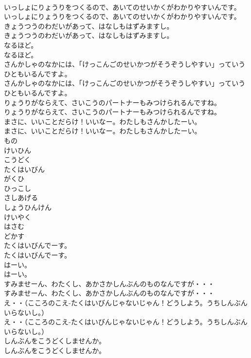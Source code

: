 \documentclass[8pt]{extreport}
\begin{document}
\begin{CJK}{UTF8}{min}
\\	いっしょにりょうりをつくるので、あいてのせいかくがわかりやすいんです。
\\	いっしょにりょうりをつくるので、あいてのせいかくがわかりやすいんです。
\\	きょうつうのわだいがあって、はなしもはずみますし。
\\	きょうつうのわだいがあって、はなしもはずみますし。
\\	なるほど。
\\	なるほど。
\\	さんかしゃのなかには、「けっこんごのせいかつがそうぞうしやすい」っていうひともいるんですよ。
\\	さんかしゃのなかには、「けっこんごのせいかつがそうぞうしやすい」っていうひともいるんですよ。
\\	りょうりがならえて、さいこうのパートナーもみつけられるんですね。
\\	りょうりがならえて、さいこうのパートナーもみつけられるんですね。
\\	まさに、いいことだらけ！いいなー。わたしもさんかしたーい。
\\	まさに、いいことだらけ！いいなー。わたしもさんかしたーい。
\\	もの
\\	けいひん
\\	こうどく
\\	たくはいびん
\\	がくひ
\\	ひっこし
\\	さしあげる
\\	しょうひんけん
\\	けいやく
\\	はさむ
\\	どかす
\\	たくはいびんでーす。
\\	たくはいびんでーす。
\\	はーい。
\\	はーい。
\\	すみませーん、わたくし、あかさかしんぶんのものなんですが・・・
\\	すみませーん、わたくし、あかさかしんぶんのものなんですが・・・
\\	え・・（こころのこえ-たくはいびんじゃないじゃん！どうしよう。うちしんぶんいらないし。）
\\	え・・（こころのこえ-たくはいびんじゃないじゃん！どうしよう。うちしんぶんいらないし。）
\\	しんぶんをこうどくしませんか。
\\	しんぶんをこうどくしませんか。

\end{CJK}
\end{document}
